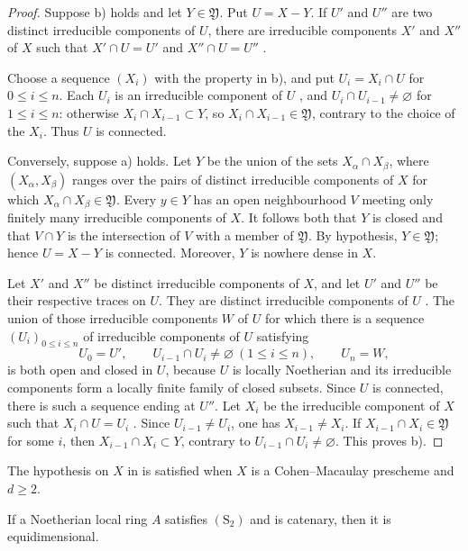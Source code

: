 \begin{proof}
Suppose {\rm b)} holds and let $Y\in\mathfrak Y$.  Put
$U=X-Y$.  If $U'$ and $U''$ are two distinct irreducible
components of $U$, there are irreducible components $X'$ and
$X''$ of $X$ such that
$X'\cap U=U'$ and $X''\cap U=U''$ .


Choose a sequence $(X_i)$ with the property in {\rm b)}, and put
$U_i=X_i\cap U$ for $0\leq i\leq n$.  Each $U_i$ is an
irreducible component of $U$ , and
$U_i\cap U_{i-1}\ne\varnothing$ for $1\leq i\leq n$: otherwise
$X_i\cap X_{i-1}\subset Y$, so
$X_i\cap X_{i-1}\in\mathfrak Y$, contrary to the choice of the
$X_i$.  Thus $U$ is connected.

Conversely, suppose {\rm a)} holds.  Let $Y$ be the union of the
sets $X_\alpha\cap X_\beta$, where $(X_\alpha,X_\beta)$ ranges
over the pairs of distinct irreducible components of $X$ for
which $X_\alpha\cap X_\beta\in\mathfrak Y$.  Every $y\in Y$ has
an open neighbourhood $V$ meeting only finitely many irreducible
components of $X$.  It follows both that $Y$ is closed and that
$V\cap Y$ is the intersection of $V$ with a member of
$\mathfrak Y$.  By hypothesis, $Y\in\mathfrak Y$; hence
$U=X-Y$ is connected.  Moreover, $Y$ is nowhere dense in $X$.

Let $X'$ and $X''$ be distinct irreducible components of $X$, and
let $U'$ and $U''$ be their respective traces on $U$.  They are
distinct irreducible components of $U$ .
The union of those irreducible components $W$ of $U$ for which
there is a sequence $(U_i)_{0\leq i\leq n}$ of irreducible
components of $U$ satisfying
\[
  U_0=U',\qquad
  U_{i-1}\cap U_i\ne\varnothing\ (1\leq i\leq n),\qquad
  U_n=W,
\]
is both open and closed in $U$, because $U$ is locally
Noetherian and its irreducible components form a locally finite
family of closed subsets.  Since $U$ is connected, there is such
a sequence ending at $U''$.  Let $X_i$ be the irreducible
component of $X$ such that $X_i\cap U=U_i$
.  Since $U_{i-1}\ne U_i$, one has
$X_{i-1}\ne X_i$.  If
$X_{i-1}\cap X_i\in\mathfrak Y$ for some $i$, then
$X_{i-1}\cap X_i\subset Y$, contrary to
$U_{i-1}\cap U_i\ne\varnothing$.  This proves {\rm b)}.
\end{proof}

The hypothesis on $X$ in  is satisfied when $X$
is a Cohen--Macaulay prescheme and $d\geq2$.

\begin{corollary}[5.10.9]
\label{IV.5.10.9}
If a Noetherian local ring $A$ satisfies $(\mathrm S_2)$ and is
catenary, then it is equidimensional.
\end{corollary}

